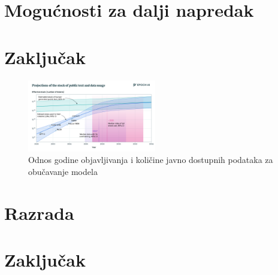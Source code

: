 \documentclass[12pt,oneside]{memoir}
\begin{document}
\chapter{Mogućnosti za dalji napredak}

\chapter{Zaključak}

\begin{figure}[!ht]
	\centering
	\label{fig:LLMDataConsumption}
	\includegraphics[width=0.5\textwidth]{LLMDataConsumption.png}
	\caption{Odnos godine objavljivanja i količine javno dostupnih podataka za obučavanje modela}
\end{figure}

\cite{LLMDataConsumption}


\chapter{Razrada}
\label{chp:razrada}


\pangrami

\pangrami

\chapter{Zaključak}
\pangrami

\pangrami




\backmatter
\end{document}
